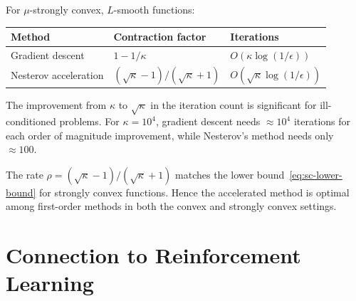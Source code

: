 \documentclass[11pt,a4paper]{article}
\begin{document}
\begin{remark}%
\label{rem:sc-comparison}
For $\mu$-strongly convex, $L$-smooth functions:
\begin{center}
\begin{tabular}{lll}
\toprule
\textbf{Method} & \textbf{Contraction factor} & \textbf{Iterations} \\
\midrule
Gradient descent & $1 - 1/\kappa$ &
  $O(\kappa \log(1/\epsilon))$ \\
Nesterov acceleration & $(\sqrt\kappa - 1)/(\sqrt\kappa + 1)$ &
  $O(\sqrt\kappa \log(1/\epsilon))$ \\
\bottomrule
\end{tabular}
\end{center}
The improvement from $\kappa$ to $\sqrt\kappa$ in the iteration count
is significant for ill-conditioned problems. For $\kappa = 10^4$,
gradient descent needs $\approx 10^4$ iterations for each order of
magnitude improvement, while Nesterov's method needs only $\approx 100$.
\end{remark}

\begin{remark}\label{rem:sc-optimal}
The rate $\rho = (\sqrt\kappa - 1)/(\sqrt\kappa + 1)$ matches the
lower bound~\eqref{eq:sc-lower-bound} for strongly convex functions.
Hence the accelerated method is optimal among first-order methods in
both the convex and strongly convex settings.
\end{remark}


\section{Connection to Reinforcement Learning}\label{sec:rl-connection}
\end{document}
